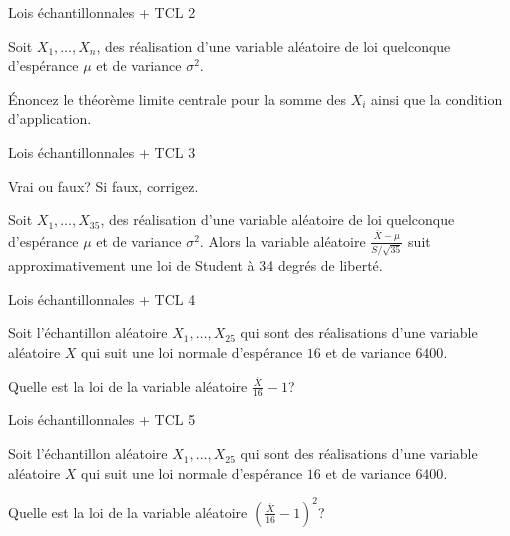 \documentclass{BeamerTemplate}
\begin{document}
\begin{frame}{Lois échantillonnales + TCL 2}\label{ech2}
\begin{center}
Soit $X_1,\hdots, X_{n}$, des réalisation d'une variable aléatoire de loi quelconque d'espérance $\mu$ et de variance $\sigma^2$.

\medskip
Énoncez le théorème limite centrale pour la somme des $X_i$ ainsi que la condition d'application.

\end{center}

\end{frame}

\begin{frame}{Lois échantillonnales + TCL 3}\label{ech3}
\begin{center}

Vrai ou faux? Si faux, corrigez.
\medskip

Soit $X_1,\hdots, X_{35}$, des réalisation d'une variable aléatoire de loi quelconque d'espérance $\mu$ et de variance $\sigma^2$. Alors la variable aléatoire $\displaystyle \frac{\overline{X}-\mu}{S/\sqrt{35}}$ suit approximativement une loi de Student à 34 degrés de liberté.

\end{center}

\end{frame}

\begin{frame}{Lois échantillonnales + TCL 4}\label{ech4}
\begin{center}

Soit l'échantillon aléatoire $X_1,\hdots,X_{25}$ qui sont des réalisations d'une variable aléatoire $X$ qui suit une loi normale d'espérance $16$ et de variance $6400$.

\medskip

Quelle est la loi de la variable aléatoire $\displaystyle \frac{\overline{X}}{16}-1$?


\end{center}

\end{frame}


\begin{frame}{Lois échantillonnales + TCL 5}\label{ech5}
\begin{center}

Soit l'échantillon aléatoire $X_1,\hdots,X_{25}$ qui sont des réalisations d'une variable aléatoire $X$ qui suit une loi normale d'espérance $16$ et de variance $6400$.

\medskip

Quelle est la loi de la variable aléatoire $\left(\displaystyle \frac{\overline{X}}{16}-1\right)^2$?

\end{center}

\end{frame}
\end{document}
